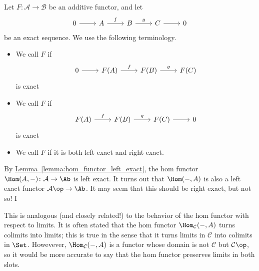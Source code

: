 \documentclass[main.tex]{subfiles}
\begin{document}
\begin{definition}
  \label{def:exact_functor}
  Let $F\colon \mathcal{A} \to \mathcal{B}$ be an additive functor, and let
  \begin{equation*}
    \begin{tikzcd}
      0
      \arrow[r]
      & A
      \arrow[r, "f"]
      & B
      \arrow[r, "g"]
      & C
      \arrow[r]
      & 0
    \end{tikzcd}
  \end{equation*}
  be an exact sequence. We use the following terminology.
  \begin{itemize}
    \item We call $F$  if
      \begin{equation*}
        \begin{tikzcd}
          0
          \arrow[r]
          & F(A)
          \arrow[r, "f"]
          & F(B)
          \arrow[r, "g"]
          & F(C)
        \end{tikzcd}
      \end{equation*}
      is exact

    \item We call $F$  if
      \begin{equation*}
        \begin{tikzcd}
          F(A)
          \arrow[r, "f"]
          & F(B)
          \arrow[r, "g"]
          & F(C)
          \arrow[r]
          & 0
        \end{tikzcd}
      \end{equation*}
      is exact

    \item We call $F$  if it is both left exact and right exact.
  \end{itemize}
\end{definition}

\begin{example}
  By \hyperref[lemma:hom_functor_left_exact]{Lemma~\ref*{lemma:hom_functor_left_exact}}, the hom functor $\Hom(A, -)\colon \mathcal{A} \to \Ab$ is left exact. It turns out that $\Hom(-, A)$ is also a left exact functor $\mathcal{A}\op \to \Ab$. It may seem that this should be right exact, but not so! I

  This is analogous (and closely related!) to the behavior of the hom functor with respect to limits. It is often stated that the hom functor $\Hom_{\mathcal{C}}(-, A)$ turns colimits into limits; this is true in the sense that it turns limits in $\mathcal{C}$ into colimits in $\Set$. Howevever, $\Hom_{\mathcal{C}}(-, A)$ is a functor whose domain is not $\mathcal{C}$ but $\mathcal{C}\op$, so it would be more accurate to say that the hom functor preserves limits in both slots.
\end{example}
\end{document}
